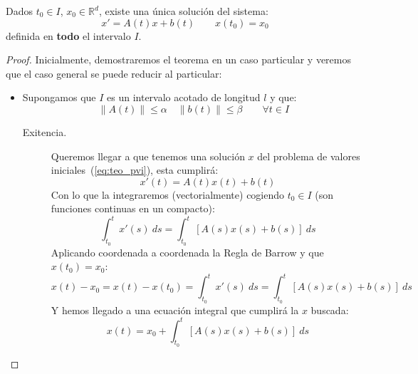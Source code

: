 \begin{teo}\label{teo:existencia_unicidad_sistemas}
    Dados $t_0\in I$, $x_0\in \mathbb{R}^d$, existe una única solución del sistema:
    \begin{equation}\label{eq:teo_pvi}
        x' = A(t)x + b(t) \qquad x(t_0) = x_0
    \end{equation}
    definida en \textbf{todo} el intervalo $I$.
    \begin{proof}
        Inicialmente, demostraremos el teorema en un caso particular y veremos que el caso general se puede reducir al particular:
        \begin{itemize}
            \item Supongamos que $I$ es un intervalo acotado de longitud $l$ y que:
                \begin{equation*}
                    \|A(t)\| \leq \alpha \quad \|b(t)\|\leq \beta \qquad \forall t\in I
                \end{equation*}
                \begin{description}
                    \item [Exitencia.] Queremos llegar a que tenemos una solución $x$ del problema de valores iniciales~(\ref{eq:teo_pvi}), esta cumplirá:
                        \begin{equation*}
                            x'(t) = A(t)x(t) + b(t)
                        \end{equation*}
                        Con lo que la integraremos (vectorialmente) cogiendo $t_0\in I$ (son funciones continuas en un compacto):
                        \begin{equation*}
                            \int_{t_0}^{t} x'(s)~ds  = \int_{t_0}^{t} [A(s)x(s) + b(s)]~ds 
                        \end{equation*}
                        Aplicando coordenada a coordenada la Regla de Barrow y que $x(t_0) = x_0$:
                        \begin{equation*}
                            x(t) - x_0 = x(t) - x(t_0) = \int_{t_0}^{t} x'(s)~ds  = \int_{t_0}^{t} [A(s)x(s) + b(s)]~ds 
                        \end{equation*}
                        Y hemos llegado a una ecuación integral que cumplirá la $x$ buscada:
                        \begin{equation*}
                            x(t) = x_0 + \int_{t_0}^{t} [A(s)x(s) + b(s)]~ds 
                        \end{equation*}

\end{description}
\end{itemize}
\end{proof}
\end{teo}
